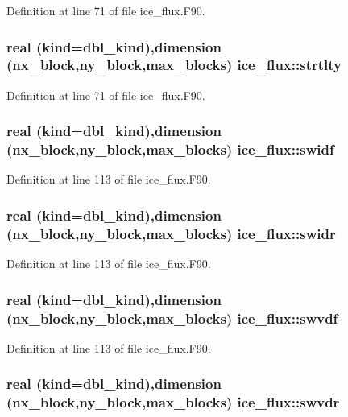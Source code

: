 Definition at line 71 of file ice\_\-flux.F90.\hypertarget{namespaceice__flux_ac9c1e92371b4e39d2aa9f38548b011ff}{
\subsubsection[{strtlty}]{\setlength{\rightskip}{0pt plus 5cm}real (kind=dbl\_\-kind),dimension (nx\_\-block,ny\_\-block,max\_\-blocks) {\bf ice\_\-flux::strtlty}}}
\label{namespaceice__flux_ac9c1e92371b4e39d2aa9f38548b011ff}


Definition at line 71 of file ice\_\-flux.F90.\hypertarget{namespaceice__flux_aa83ef052badcc8ce13f5cdcfd363ae0d}{
\subsubsection[{swidf}]{\setlength{\rightskip}{0pt plus 5cm}real (kind=dbl\_\-kind),dimension (nx\_\-block,ny\_\-block,max\_\-blocks) {\bf ice\_\-flux::swidf}}}
\label{namespaceice__flux_aa83ef052badcc8ce13f5cdcfd363ae0d}


Definition at line 113 of file ice\_\-flux.F90.\hypertarget{namespaceice__flux_a9062bc1d6f167d11fe38ea7308cea20b}{
\subsubsection[{swidr}]{\setlength{\rightskip}{0pt plus 5cm}real (kind=dbl\_\-kind),dimension (nx\_\-block,ny\_\-block,max\_\-blocks) {\bf ice\_\-flux::swidr}}}
\label{namespaceice__flux_a9062bc1d6f167d11fe38ea7308cea20b}


Definition at line 113 of file ice\_\-flux.F90.\hypertarget{namespaceice__flux_a8c5ea2d2d5d2cd3a07df830e1b7df7c8}{
\subsubsection[{swvdf}]{\setlength{\rightskip}{0pt plus 5cm}real (kind=dbl\_\-kind),dimension (nx\_\-block,ny\_\-block,max\_\-blocks) {\bf ice\_\-flux::swvdf}}}
\label{namespaceice__flux_a8c5ea2d2d5d2cd3a07df830e1b7df7c8}


Definition at line 113 of file ice\_\-flux.F90.\hypertarget{namespaceice__flux_af1a375e8ebfd339a67514570411f3562}{
\subsubsection[{swvdr}]{\setlength{\rightskip}{0pt plus 5cm}real (kind=dbl\_\-kind),dimension (nx\_\-block,ny\_\-block,max\_\-blocks) {\bf ice\_\-flux::swvdr}}}
\label{namespaceice__flux_af1a375e8ebfd339a67514570411f3562}


